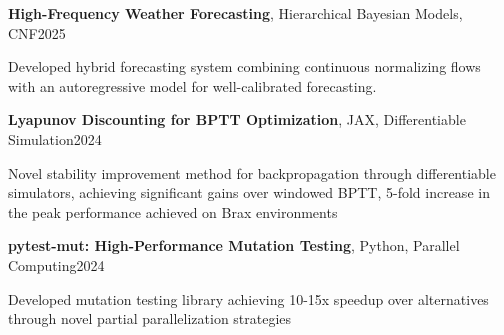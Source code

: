 \documentclass[11pt, a4paper]{article}
\newcommand{\entrytitle}[3]{%
    \noindent\textbf{#1}, #2\hfill#3%
}
\begin{document}
\entrytitle{High-Frequency Weather Forecasting}{Hierarchical Bayesian Models, CNF}{2025}
\begin{details}
    \item Developed hybrid forecasting system combining continuous normalizing flows with an autoregressive model for well-calibrated forecasting.
\end{details}

\entrytitle{Lyapunov Discounting for BPTT Optimization}{JAX, Differentiable Simulation}{2024}
\begin{details}
    \item Novel stability improvement method for backpropagation through differentiable simulators, achieving significant gains over windowed BPTT, 5-fold increase in the peak performance achieved on Brax environments
\end{details}

\entrytitle{pytest-mut: High-Performance Mutation Testing}{Python, Parallel Computing}{2024}
\begin{details}
    \item Developed mutation testing library achieving 10-15x speedup over alternatives through novel partial parallelization strategies
\end{details}
\end{document}
